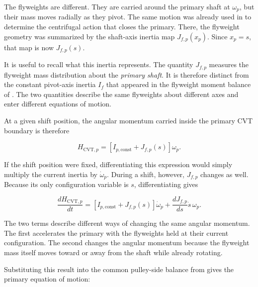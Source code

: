 \documentclass[11pt]{report}
\numberwithin{equation}{section}
\begin{document}
The flyweights are different. They are carried around the primary shaft at
\(\omega_p\), but their mass moves radially as they pivot. The same motion was
already used in  to determine the
centrifugal action that closes the primary. There, the flyweight geometry was
summarized by the shaft-axis inertia map \(J_{f,p}(x_p)\). Since
\(x_p=s\), that map is now \(J_{f,p}(s)\).

It is useful to recall what this inertia represents. The quantity
\(J_{f,p}\) measures the flyweight mass distribution about the \emph{primary
shaft}. It is therefore distinct from the constant pivot-axis inertia \(I_f\)
that appeared in the flyweight moment balance of
. The two quantities describe the
same flyweights about different axes and enter different equations of motion.

At a given shift position, the angular momentum carried inside the primary CVT
boundary is therefore

\begin{equation}
    H_{\mathrm{CVT},p}
    =
    \left[
        I_{p,\mathrm{const}}
        +
        J_{f,p}(s)
    \right]
    \omega_p.
    \label{eq:primary_pulley_angular_momentum}
\end{equation}

If the shift position were fixed, differentiating this expression would simply
multiply the current inertia by \(\dot\omega_p\). During a shift, however,
\(J_{f,p}\) changes as well. Because its only configuration variable is
\(s\), differentiating  gives

\begin{equation}
    \frac{dH_{\mathrm{CVT},p}}{dt}
    =
    \left[
        I_{p,\mathrm{const}}
        +
        J_{f,p}(s)
    \right]
    \dot\omega_p
    +
    \frac{dJ_{f,p}}{ds}\dot s\,\omega_p.
    \label{eq:primary_pulley_angular_momentum_rate}
\end{equation}

The two terms describe different ways of changing the same angular momentum.
The first accelerates the primary with the flyweights held at their current
configuration. The second changes the angular momentum because the flyweight
mass itself moves toward or away from the shaft while already rotating.

Substituting this result into the common pulley-side balance from
 gives the primary equation
of motion:
\end{document}
